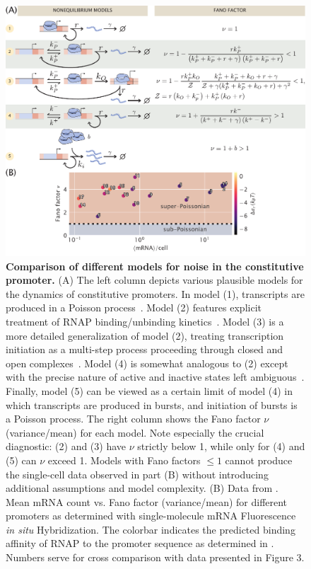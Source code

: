\begin{figure}%
\centering
\includegraphics[width=\textwidth]{../../figures/main/fig02.pdf}
\caption{\textbf{Comparison of different models for noise in the constitutive promoter.}
(A) The left column depicts various plausible models for the dynamics of
constitutive promoters. In model (1), transcripts are produced in a Poisson
process~\cite{Sanchez2013, Jones2014}. Model (2) features explicit treatment of
RNAP binding/unbinding kinetics~\cite{Phillips2015a}. Model (3) is a more
detailed generalization of model (2), treating transcription initiation as a
multi-step process proceeding through closed and open
complexes~\cite{Mitarai2015}. Model (4) is somewhat analogous to (2) except with
the precise nature of active and inactive states left
ambiguous~\cite{Peccoud1995, Shahrezaei2008, Razo-Mejia2020}. Finally, model (5)
can be viewed as a certain limit of model (4) in which transcripts are produced
in bursts, and initiation of bursts is a Poisson process. 
The right column shows the Fano factor $\nu$ (variance/mean) for each model.
Note especially the crucial diagnostic: (2) and (3) have $\nu$ strictly below 1,
while only for (4) and (5) can $\nu$ exceed 1. Models with Fano factors $\le 1$
cannot produce the single-cell data observed in part (B) without introducing
additional assumptions and model complexity. (B) Data from \cite{Jones2014}.
Mean mRNA count vs. Fano factor (variance/mean) for different promoters as
determined with single-molecule mRNA Fluorescence \textit{in situ}
Hybridization. The colorbar indicates the predicted binding affinity of RNAP to
the promoter sequence as determined in \cite{Brewster2012}. Numbers serve for
cross comparison with data presented in Figure 3.}
\label{fig2:constit_cartoons}
\end{figure}

